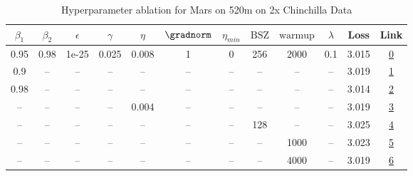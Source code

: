 \begin{table}[H]
\centering
\caption{Hyperparameter ablation for Mars on 520m on 2x Chinchilla Data}
\label{tab:ablation_mars_520m_on_2x_chinchilla_data}
\begin{tabular}{cccccccccccc}
\toprule
$\beta_1$ & $\beta_2$ & $\epsilon$ & $\gamma$ & $\eta$ & $\gradnorm$ & $\eta_{min}$ & $\mathrm{BSZ}$ & $\mathrm{warmup}$ & $\lambda$ & Loss & Link \\
\midrule
0.95 & 0.98 & 1e-25 & 0.025 & 0.008 & 1 & 0 & 256 & 2000 & 0.1 & 3.015 & \href{https://wandb.ai/stanford-mercury/optimizer-scaling/runs/sweep-520m-21B-mars1ddcddlr0.008-wd0.1-minlr0-warmup2000-b10.95--e9c503}{0} \\
\midrule
0.9 & -- & -- & -- & -- & -- & -- & -- & -- & -- & 3.019 & \href{https://wandb.ai/stanford-mercury/optimizer-scaling/runs/sweep-520m-21B-mars95d994lr0.008-wd0.1-minlr0-warmup2000-b10.9-b-82302a}{1} \\
0.98 & -- & -- & -- & -- & -- & -- & -- & -- & -- & 3.014 & \href{https://wandb.ai/stanford-mercury/optimizer-scaling/runs/sweep-520m-21B-mars1125cblr0.008-wd0.1-minlr0-warmup2000-b10.98--1a971c}{2} \\
-- & -- & -- & -- & 0.004 & -- & -- & -- & -- & -- & 3.019 & \href{https://wandb.ai/stanford-mercury/optimizer-scaling/runs/sweep-520m-21B-mars79301dlr0.004-wd0.1-minlr0-warmup2000-b10.95--3c45f1}{3} \\
-- & -- & -- & -- & -- & -- & -- & 128 & -- & -- & 3.025 & \href{https://wandb.ai/stanford-mercury/optimizer-scaling/runs/sweep-520m-21B-mars50507flr0.008-wd0.1-minlr0-warmup2000-b10.95--4cefa8}{4} \\
-- & -- & -- & -- & -- & -- & -- & -- & 1000 & -- & 3.023 & \href{https://wandb.ai/stanford-mercury/optimizer-scaling/runs/sweep-520m-21B-marse5a362lr0.008-wd0.1-minlr0-warmup1000-b10.95--03de08}{5} \\
-- & -- & -- & -- & -- & -- & -- & -- & 4000 & -- & 3.019 & \href{https://wandb.ai/stanford-mercury/optimizer-scaling/runs/sweep-520m-21B-mars6baa9blr0.008-wd0.1-minlr0-warmup4000-b10.95--dcbf07}{6} \\
\bottomrule
\end{tabular}
\end{table}

